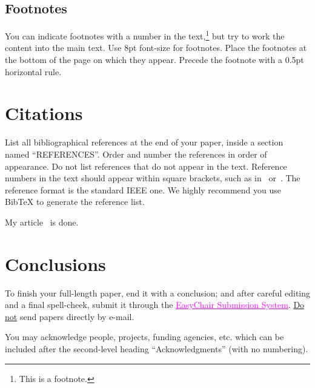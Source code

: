 \documentclass{article}
\begin{document}

\subsection{Footnotes}
You can indicate footnotes with a number in the text,\footnote{This is a footnote.}
but try to work the content into the main text.
Use 8pt font-size for footnotes. 
Place the footnotes at the bottom of the page 
on which they appear. 
Precede the footnote with a 0.5pt horizontal rule.

\section{Citations}
List all bibliographical references at the end of your paper,
inside a section named ``REFERENCES''.
Order and number the references in order of appearance. 
Do not list references that do not appear in the text.
Reference numbers in the text should appear within square brackets, such as 
in~\cite{Someone:13} or~\cite{Someone:13,Someone:04,Someone:09}.
The reference format is the standard IEEE one. 
We highly recommend you use BibTeX 
to generate the reference list.

My article~\cite{Bhagwati2013} is done.

\section{Conclusions}
To finish your full-length paper, end it with a conclusion;
and after careful editing and a final spell-cheek,
submit it through the \href{https://easychair.org/conferences/?conf=tenor2020}{\textcolor {magenta} {\underline {EasyChair Submission System}}}. 
\underline{Do not} send papers directly by e-mail.
%
\begin{acknowledgments}
You may acknowledge people, projects, 
funding agencies, etc. 
which can be included after the second-level heading
``Acknowledgments'' (with no numbering).
\end{acknowledgments} 

\balance

\end{document}
